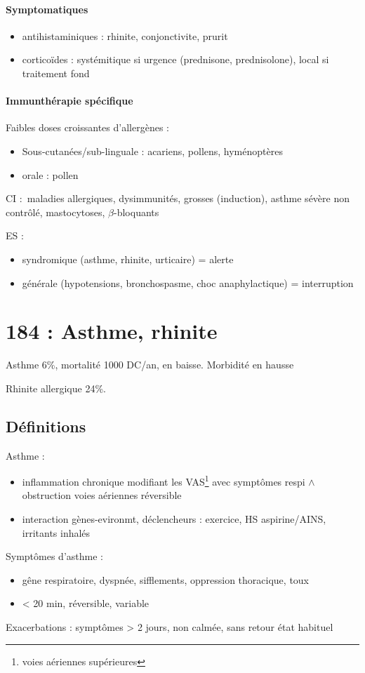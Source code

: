 \documentclass{article}
\begin{document}
\paragraph{Symptomatiques}
\begin{itemize}
  \item antihistaminiques : rhinite, conjonctivite, prurit
  \item corticoïdes : systémitique si urgence (prednisone, prednisolone), local
    si traitement fond
\end{itemize}

\paragraph{Immunthérapie spécifique}
Faibles doses croissantes d'allergènes :
\begin{itemize}
  \item Sous-cutanées/sub-linguale : acariens, pollens, hyménoptères
  \item orale : pollen
\end{itemize}
CI : maladies allergiques, dysimmunités, grosses (induction), asthme sévère non
contrôlé, mastocytoses, $\beta$-bloquants

ES : 
\begin{itemize}
  \item syndromique (asthme, rhinite, urticaire) = alerte
  \item générale (hypotensions, bronchospasme, choc anaphylactique) =
    interruption
\end{itemize}


\section{184 : Asthme, rhinite}
Asthme 6\%, mortalité 1000 DC/an, en baisse. Morbidité en hausse

Rhinite allergique 24\%.
\subsection{Définitions}
Asthme : 
\begin{itemize}
\item inflammation chronique modifiant les VAS\footnote{voies aériennes
supérieures} avec symptômes respi \(\wedge\) obstruction voies aériennes réversible
\item interaction gènes-evironmt, déclencheurs : exercice, HS aspirine/AINS,
irritants inhalés
\end{itemize}
Symptômes d'asthme : 
\begin{itemize}
\item gêne respiratoire, dyspnée, sifflements, oppression thoracique,
toux
\item < 20 min, réversible, variable
\end{itemize}
Exacerbations : \nearrow symptômes > 2 jours, non calmée, sans retour état
habituel
\end{document}
